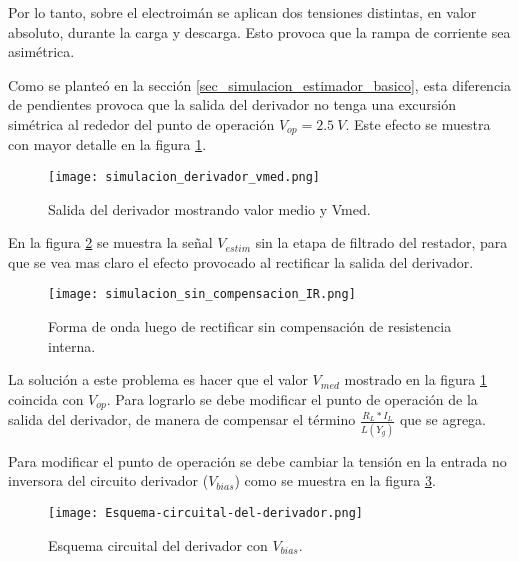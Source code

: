 Por lo tanto, sobre el electroimán se aplican dos tensiones distintas, en valor absoluto, durante la carga y descarga. Esto provoca que la rampa de corriente sea asimétrica.

Como se planteó en la sección \ref{sec_simulacion_estimador_basico}, esta diferencia de pendientes provoca que la salida del derivador no tenga una excursión simétrica al rededor del punto de operación $V_{op}=2.5\:V$. Este efecto se muestra con mayor detalle en la figura \ref{fig:img_simulacion_derivador_vmed}.

\begin{figure}[H]
	\centering
	\texttt{[image: simulacion\_derivador\_vmed.png]}
	\caption{Salida del derivador mostrando valor medio y Vmed.}
	\label{fig:img_simulacion_derivador_vmed}
\end{figure}

En la figura \ref{fig:img_simulacion_sin_compensacion_IR} se muestra la señal $V_{estim}$ sin la etapa de filtrado del restador, para que se vea mas claro el efecto provocado al rectificar la salida del derivador. 


\begin{figure}[H]
	\centering
	\texttt{[image: simulacion\_sin\_compensacion\_IR.png]}
	\caption{Forma de onda luego de rectificar sin compensación de resistencia interna.}
	\label{fig:img_simulacion_sin_compensacion_IR}
\end{figure}

La solución a este problema es hacer que el valor $V_{med}$ mostrado en la figura \ref{fig:img_simulacion_derivador_vmed} coincida con $V_{op}$. Para lograrlo se debe modificar el punto de operación de la salida del derivador, de manera de compensar el término $\frac{R_L*I_L}{L(Y_g)}$ que se agrega.

Para modificar el punto de operación se debe cambiar la tensión en la entrada no inversora del circuito derivador ($V_{bias}$) como se muestra en la figura \ref{fig:img_Esquema-circuital-del-derivador}. 

\begin{figure}[H]
	\centering
	\texttt{[image: Esquema-circuital-del-derivador.png]}
	\caption{Esquema circuital del derivador con $V_{bias}$.}
	\label{fig:img_Esquema-circuital-del-derivador}
\end{figure}

